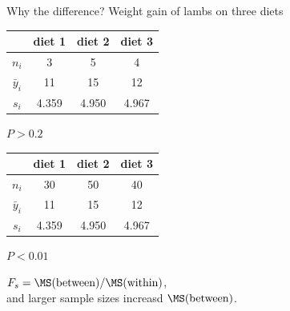 \begin{frame}{Why the difference?}
    Weight gain of lambs on three diets

    \begin{center}
        \begin{tabular}{cccc}
            & diet 1 & diet 2 & diet 3 \\
            \hline
            $n_i$ & 3 & 5 & 4 \\
            $\bar y_i$ & 11 & 15 & 12 \\
            $s_i$ & 4.359 & 4.950 & 4.967 \\
        \end{tabular}
    \end{center}

    \hspace{4em}\alert{    $P>0.2$}

    \vspace{3em}

    \begin{center}
        \begin{tabular}{cccc}
            & diet 1 & diet 2 & diet 3 \\
            \hline
            $n_i$ & 30 & 50 & 40 \\
            $\bar y_i$ & 11 & 15 & 12 \\
            $s_i$ & 4.359 & 4.950 & 4.967 \\
        \end{tabular}
    \end{center}
    \hspace{4em}\alert{$P<0.01$}

    \pause
    \vspace{2em}

    $F_s = \MS(\text{between})/\MS(\text{within})$, \\
    and larger sample sizes \alert{increasd $\MS(\text{between})$}.


  \end{frame}

